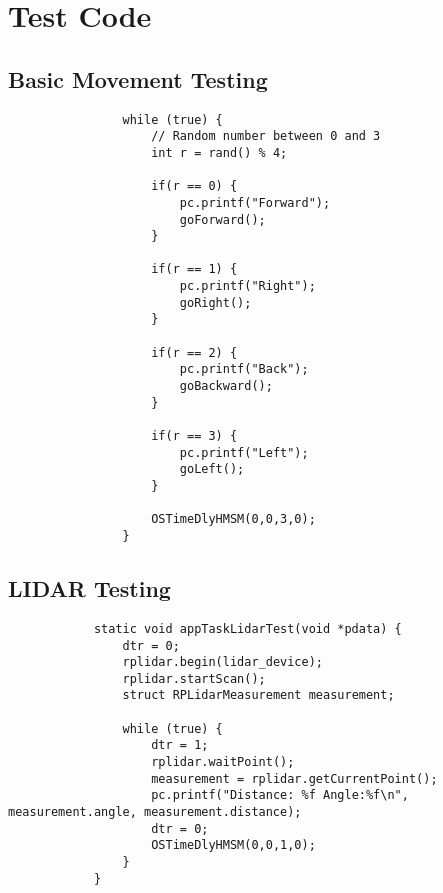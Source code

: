 		\section{Test Code}
		\label{testing:testcode}
			\subsection{Basic Movement Testing}
			\label{testcode:movementbasic}
			\begin{lstlisting}
				while (true) {
					// Random number between 0 and 3
					int r = rand() % 4;
					
					if(r == 0) {
						pc.printf("Forward");
						goForward();
					}
					
					if(r == 1) {
						pc.printf("Right");
						goRight();
					}
					
					if(r == 2) {
						pc.printf("Back");
						goBackward();
					}
					
					if(r == 3) {
						pc.printf("Left");
						goLeft();
					}

					OSTimeDlyHMSM(0,0,3,0);
				}
			\end{lstlisting}
			
			\subsection{LIDAR Testing}
			\label{testcode:observation1}
			\begin{lstlisting}
			static void appTaskLidarTest(void *pdata) {
				dtr = 0;
				rplidar.begin(lidar_device);
				rplidar.startScan();
				struct RPLidarMeasurement measurement;
				
				while (true) {
					dtr = 1;
					rplidar.waitPoint();
					measurement = rplidar.getCurrentPoint();
					pc.printf("Distance: %f Angle:%f\n", measurement.angle, measurement.distance);
					dtr = 0;
					OSTimeDlyHMSM(0,0,1,0);
				}
			}
			\end{lstlisting}
			
